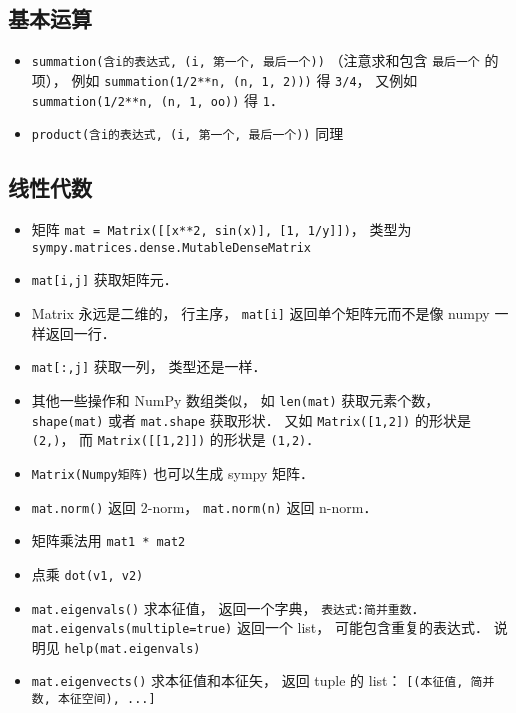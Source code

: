 \subsection{基本运算}
\begin{itemize}
\item \verb|summation(含i的表达式, (i, 第一个, 最后一个))| （注意求和包含 \verb|最后一个| 的项）， 例如 \verb|summation(1/2**n, (n, 1, 2)))| 得 \verb|3/4|， 又例如 \verb|summation(1/2**n, (n, 1, oo))| 得 \verb|1|．
\item \verb|product(含i的表达式, (i, 第一个, 最后一个))| 同理
\end{itemize}

\subsection{线性代数}
\begin{itemize}
\item 矩阵 \verb|mat = Matrix([[x**2, sin(x)], [1, 1/y]])|， 类型为 \verb|sympy.matrices.dense.MutableDenseMatrix|
\item \verb|mat[i,j]| 获取矩阵元．
\item Matrix 永远是二维的， 行主序， \verb|mat[i]| 返回单个矩阵元而不是像 numpy 一样返回一行．
\item \verb|mat[:,j]| 获取一列， 类型还是一样．
\item 其他一些操作和 NumPy 数组类似， 如 \verb|len(mat)| 获取元素个数， \verb|shape(mat)| 或者 \verb|mat.shape| 获取形状． 又如 \verb|Matrix([1,2])| 的形状是 \verb|(2,)|， 而 \verb|Matrix([[1,2]])| 的形状是 \verb|(1,2)|．
\item \verb|Matrix(Numpy矩阵)| 也可以生成 sympy 矩阵．
\item \verb|mat.norm()| 返回 2-norm， \verb|mat.norm(n)| 返回 n-norm．
\item 矩阵乘法用 \verb|mat1 * mat2|
\item 点乘 \verb|dot(v1, v2)|
\item \verb|mat.eigenvals()| 求本征值， 返回一个字典， \verb|表达式:简并重数|． \verb|mat.eigenvals(multiple=true)| 返回一个 list， 可能包含重复的表达式． 说明见 \verb|help(mat.eigenvals)|
\item \verb|mat.eigenvects()| 求本征值和本征矢， 返回 tuple 的 list： \verb|[(本征值, 简并数, 本征空间), ...]|
\end{itemize}


